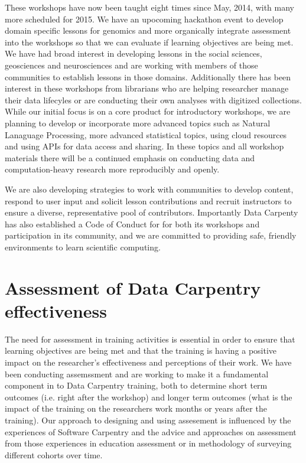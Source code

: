 \documentclass[15]{idcc}
\begin{document}
\begin{itemize}
These workshops have now been taught eight times since May, 2014, with many more scheduled for 2015. We have an
  upocoming hackathon event to develop domain specific lessons for genomics and more organically integrate assessment
  into the workshops so that we can evaluate if learning objectives are being met. We have had broad interest in developing lessons
  in the social sciences, geosciences and neurosciences and are working with members of those communities to establish lessons in those
  domains. Additionally there has been interest in these workshops from librarians who are helping researcher manage their data lifecyles
 or are conducting their own analyses with digitized collections.\\

 While our initial focus is on a core product for introductory workshops, we are planning to develop or incorporate more advanced topics
 such as Natural Lanaguage Processing, more advanced statistical topics, using cloud resources and using APIs for data access and sharing. In these topics and all workshop materials there will be a continued emphasis on conducting data and computation-heavy research more reproducibly and openly.


 We are also developing strategies to work with communities to develop content, respond to user input and solicit lesson contributions and recruit instructors to ensure a diverse, representative pool of contributors. Importantly Data Carpenty has also established a Code of Conduct for
 for both its workshops and participation in its community, and we are committed to providing safe, friendly environments to learn scientific computing.




\section{Assessment of Data Carpentry effectiveness}
The need for assessment in training activities is essential in order to ensure that learning objectives are being met and that the
training is having a positive impact on the researcher's effectiveness and perceptions of their work. We have been conducting
assemssment and are working to make it a fundamental component in to Data Carpentry training, both to determine short term outcomes
(i.e. right after
the workshop) and longer term outcomes (what is the impact of the training on the researchers work months or years after the
training). Our approach to designing and using assesement is influenced by
the experiences of Software Carpentry and the advice and approaches on assessment from those experiences in education assessment or
in methodology of surveying different cohorts over time. \\


\end{itemize}
\end{document}
